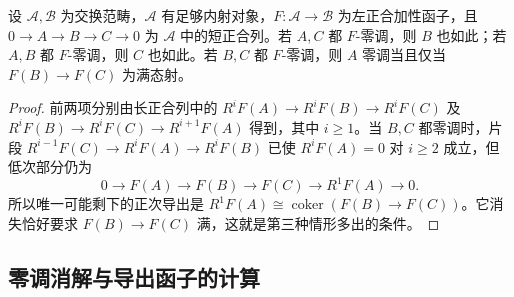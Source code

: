 \begin{proposition}\label{b4:prop:acyclic-closure}
	设 \(\mathcal A,\mathcal B\) 为交换范畴，\(\mathcal A\) 有足够内射对象，\(F:\mathcal A\to\mathcal B\) 为左正合加性函子，且 \(0\to A\to B\to C\to0\) 为 \(\mathcal A\) 中的短正合列。若 \(A,C\) 都 \(F\)-零调，则 \(B\) 也如此；若 \(A,B\) 都 \(F\)-零调，则 \(C\) 也如此。若 \(B,C\) 都 \(F\)-零调，则 \(A\) 零调当且仅当 \(F(B)\to F(C)\) 为满态射。
\end{proposition}
\begin{proof}
	前两项分别由长正合列中的 \(R^iF(A)\to R^iF(B)\to R^iF(C)\) 及 \(R^iF(B)\to R^iF(C)\to R^{i+1}F(A)\) 得到，其中 \(i\ge1\)。当 \(B,C\) 都零调时，片段 \(R^{i-1}F(C)\to R^iF(A)\to R^iF(B)\) 已使 \(R^iF(A)=0\) 对 \(i\ge2\) 成立，但低次部分仍为
	\[
		0\longrightarrow F(A)\longrightarrow F(B)\longrightarrow F(C) \longrightarrow R^1F(A)\longrightarrow0.
	\]
	所以唯一可能剩下的正次导出是 \(R^1F(A)\cong\operatorname{coker}(F(B)\to F(C))\)。它消失恰好要求 \(F(B)\to F(C)\) 满，这就是第三种情形多出的条件。
\end{proof}

\subsection{零调消解与导出函子的计算}
\label{b4:subsec:1003:02}

